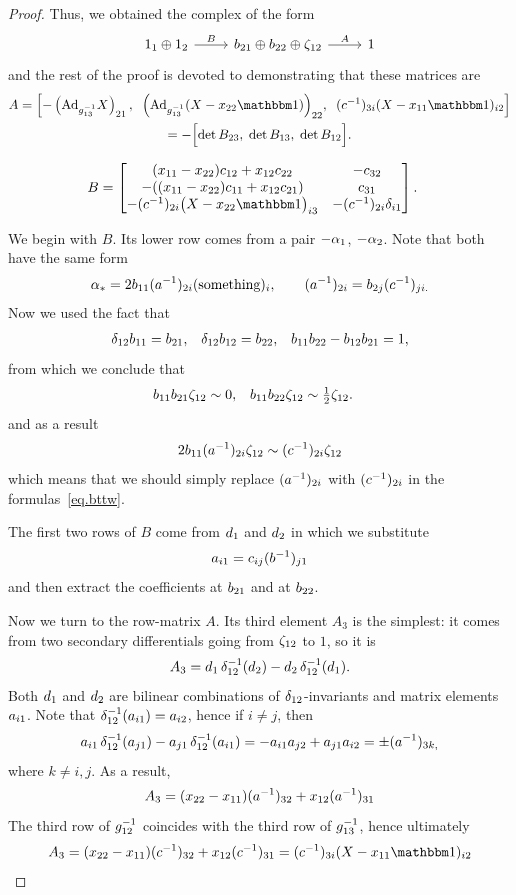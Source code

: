 \begin{proof}
Thus, we obtained the complex of the form
\[
\begin{tikzcd}
1_1 \oplus 1_2
\ar{r}{B}
&
\exbto\oplus\exbtt\oplus \ghzot
\ar{r}{A}
&
1
\end{tikzcd}
\]
and the rest of the proof is devoted to demonstrating that these matrices are
\begin{multline*}
A=\Bigl[-\left(\Adv{\xigoh}\xX\right)_{21},\;\;
  \Bigl(\Adv{\xigoh}(\xX-\xtt\xId)\Bigr)_{22},\;\;
 \civ{3}{i}(\xX - \xoo\xId)_{i2}
\Bigr]
\\=
-\Bigl[\det B_{23},\;\det B_{13},\;\det B_{12}\Bigr].
\end{multline*}

\begin{align*}
B&=
\xbmtr{
(\xoo-\xtt)\excot +\xot\exctt
&
-\excht
\\
-((\xoo-\xtt)\excoo +\xot\excto)
&
\excho
\\
-\civ{2}{i}\zXtv{i3}
&
-\civ{2}{i}\krdlv{i1}
}.
\end{align*}

We begin with $B$. Its lower row comes from a pair $-\alpha_1$, $-\alpha_2$. Note that both have the same form
\[
\alpha_* = 2b_{11} (a^{-1})_{2i}(\text{something})_i,\qquad (a^{-1})_{2i} = b_{2j}(c^{-1})_{ji.}
\]
Now we used the fact that
\begin{align*}
\delta_{12} b_{11} &= b_{21},  & \delta_{12}b_{12} & =b_{22}, & b_{11}b_{22} - b_{12}b_{21} = 1,
\end{align*}
from which we conclude that
\begin{align*}
b_{11}b_{21}\zeta_{12} &\sim 0,&
b_{11}b_{22}\zeta_{12} &\sim \tfrac{1}{2} \zeta_{12}.
\end{align*}
and as a result
\[
2b_{11}(a^{-1})_{2i}\zeta_{12}\sim (c^{-1})_{2i}\zeta_{12}
\]
which means that we should simply replace $(a^{-1})_{2i}$ with $(c^{-1})_{2i}$ in the formulas~\eqref{eq.bttw}.

The first two rows of $B$ come from $d_{1}$ and $d_{2}$ in which we substitute
\[
a_{i1} = c_{ij}(b^{-1})_{j1}
\]
and then extract the coefficients at $b_{21}$ and at $b_{22}$.

Now we turn to the row-matrix $A$. Its third element $A_3$ is the simplest: it comes from two secondary differentials going from $\zeta_{12}$ to $1$, so it is
\[
A_3 =  d_{1}\,\delta_{12}^{-1}(d_{2})-d_{2}\, \delta_{12}^{-1} (d_{1}).
\]
Both $d_{1}$ and $d_{2}$ are bilinear combinations of $\delta_{12}$-invariants and matrix elements $a_{i1}$. Note that $\delta_{12}^{-1}(a_{i1}) = a_{i2}$, hence if $i\neq j$, then
\[
a_{i1}\, \delta_{12}^{-1}(a_{j1}) - a_{j1}\,\delta_{12}^{-1}(a_{i1}) =- a_{i1}a_{j2}+a_{j1}a_{i2} =
\pm (a^{-1})_{3k,}
\]
where $k\neq i,j$. As a result,
\[
A_3 =
 (x_{22}-x_{11})(a^{-1})_{32} + x_{12}(a^{-1})_{31}
\]
The third row of $g_{12}^{-1}$ coincides with the third row of $g_{13}^{-1}$, hence ultimately
\[
A_3 =
(\xtt-\xoo)\ciht + \xot\ciho = \civ{3}{i}(\xX - \xoo\xId)_{i2}
\]
\noindent


\end{proof}
